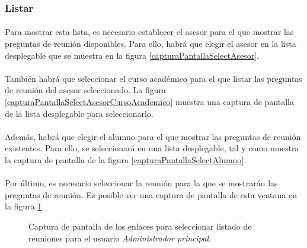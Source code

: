 \subsubsection{Listar}

  \paragraph{}Para mostrar esta lista, es necesario establecer el asesor para
  el que mostrar las preguntas de reunión disponibles. Para ello, habrá que
  elegir el asesor en la lista desplegable que se muestra en la figura
  \ref{capturaPantallaSelectAsesor}.

  \paragraph{}También habrá que seleccionar el curso académico para el que
  listar las preguntas de reunión del asesor seleccionado. La figura
  \ref{capturaPantallaSelectAsesorCursoAcademico} muestra una captura de
  pantalla de la lista desplegable para seleccionarlo.

  \paragraph{}Además, habrá que elegir el alumno para el que mostrar las
  preguntas de reunión existentes. Para ello, se seleccionará en una lista
  desplegable, tal y como muestra la captura de pantalla de la figura
  \ref{capturaPantallaSelectAlumno}.

  \paragraph{}Por último, es necesario seleccionar la reunión para la que se
  mostrarán las preguntas de reunión. Es posible ver una captura de pantalla
  de esta ventana en la figura \ref{capturaPantallaSelectReunion}.

  \begin{figure}[!ht]
    \begin{center}
      \caption{Captura de pantalla de los enlaces para seleccionar listado de reuniones para el usuario \textit{Administrador principal}.}
      \label{capturaPantallaSelectReunion}
    \end{center}
  \end{figure}

